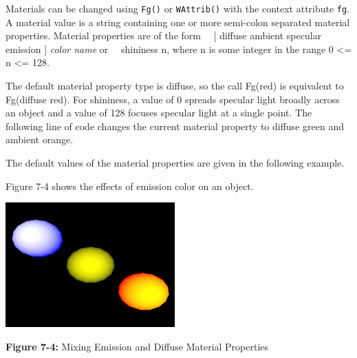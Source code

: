 Materials can be changed using \texttt{Fg()} or \texttt{WAttrib()}
with the context attribute \texttt{fg}. A material value is a string
containing one or more
semi-colon separated material properties. Material properties are of
the form\newline
\ \ [ diffuse {\textbar} ambient {\textbar} specular {\textbar} emission
] \textit{color name} \newline
or \newline
\ \ {\textquotedbl}shininess n{\textquotedbl}, where n is some integer
in the range 0 {\textless}= n
{\textless}= 128.

The default material property type is diffuse, so the call
Fg({\textquotedbl}red{\textquotedbl}) is equivalent to
Fg({\textquotedbl}diffuse red{\textquotedbl}). For shininess, a value
of 0 spreads specular light broadly across an object and a value of 128
focuses specular light at a single point. The following line of code
changes the current material property to diffuse green and ambient
orange. 


\noindent The default values of the material properties are given in the
following example. 


\noindent Figure 7-4 shows the effects of emission color on an object. 

\bigskip

{\centering 
\includegraphics[width=2.5583in,height=1.8835in]{ub-img/ub-img34.png}
\par}

{\sffamily\bfseries Figure 7-4:}
{\sffamily Mixing Emission and Diffuse Material Properties}

\bigskip


